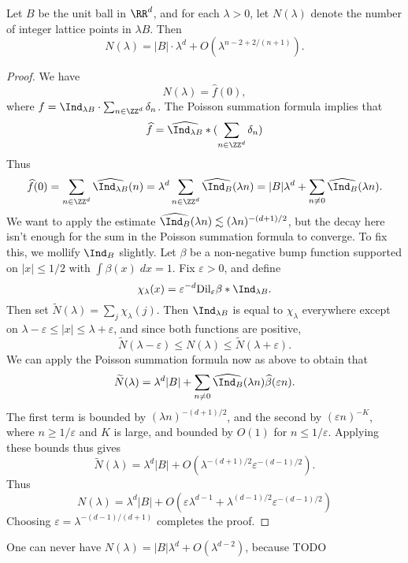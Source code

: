 \begin{theorem}
    Let $B$ be the unit ball in $\RR^d$, and for each $\lambda > 0$, let $N(\lambda)$ denote the number of integer lattice points in $\lambda B$. Then
    \[ N(\lambda) = |B| \cdot \lambda^d + O(\lambda^{n-2 + 2/(n+1)}). \]
\end{theorem}
\begin{proof}
    We have
    \[ N(\lambda) = \widehat{f}(0), \]
    where $f = \Ind_{\lambda B} \cdot \sum_{n \in \ZZ^d} \delta_n$. The Poisson summation formula implies that
    \[ \widehat{f} = \widehat{\Ind_{\lambda B}} * (\sum_{n \in \ZZ^d} \delta_n) \]
    Thus
    \[ \widehat{f}(0) = \sum_{n \in \ZZ^d} \widehat{\Ind_{\lambda B}}(n) = \lambda^d \sum_{n \in \ZZ^d} \widehat{\Ind_B}(\lambda n) = |B| \lambda^d + \sum_{n \neq 0} \widehat{\Ind_B}(\lambda n). \]
    We want to apply the estimate $\widehat{\Ind_B}(\lambda n) \lesssim (\lambda n)^{-(d+1)/2}$, but the decay here isn't enough for the sum in the Poisson summation formula to converge. To fix this, we mollify $\Ind_B$ slightly. Let $\beta$ be a non-negative bump function supported on $|x| \leq 1/2$ with $\int \beta(x)\; dx = 1$. Fix $\varepsilon > 0$, and define
    \[ \chi_\lambda(x) = \varepsilon^{-d} \text{Dil}_\varepsilon \beta * \Ind_{\lambda B}. \]
    Then set $\widetilde{N}(\lambda) = \sum_j \chi_\lambda(j)$. Then $\Ind_{\lambda B}$ is equal to $\chi_\lambda$ everywhere except on $\lambda - \varepsilon \leq |x| \leq \lambda + \varepsilon$, and since both functions are positive,
    \[ \widetilde{N}(\lambda - \varepsilon) \leq N(\lambda) \leq \widetilde{N}(\lambda + \varepsilon). \]
    We can apply the Poisson summation formula now as above to obtain that
    \[ \widetilde{N}(\lambda) = \lambda^d |B| + \sum_{n \neq 0} \widehat{\Ind_B}(\lambda n) \widehat{\beta}(\varepsilon n). \]
    The first term is bounded by $(\lambda n)^{-(d+1)/2}$, and the second by $(\varepsilon n)^{-K}$, where $n \geq 1/\varepsilon$ and $K$ is large, and bounded by $O(1)$ for $n \leq 1/\varepsilon$. Applying these bounds thus gives
    \[ \widetilde{N}(\lambda) = \lambda^d |B| + O( \lambda^{-(d+1)/2} \varepsilon^{-(d-1)/2} ). \]
    Thus
    \[ N(\lambda) = \lambda^d |B| + O( \varepsilon \lambda^{d-1} + \lambda^{(d-1)/2} \varepsilon^{-(d-1)/2} ) \]
    Choosing $\varepsilon = \lambda^{-(d-1)/(d+1)}$ completes the proof.
\end{proof}

\begin{remark}
    One can never have $N(\lambda) = |B| \lambda^d + O(\lambda^{d-2})$, because TODO
\end{remark}








